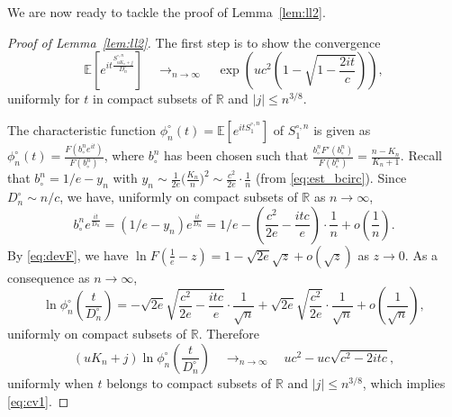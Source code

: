 \documentclass[11pt]{article}
\theoremstyle{definition}
\numberwithin{equation}{section}
\numberwithin{figure}{section}
\numberwithin{table}{section}
\newcommand{\R}{\mathbb{R}}
\def\bcn{b_{\circ}^{n}}
\def\Scn{S^{\circ,n}}
\def\phicn{\phi^{\circ}_{n}}
\def\Dcn{D^{\circ}_{n}}
\newcommand\Es[1]{\mathbb{E}\left[#1\right]}
\begin{document}
We are now ready to tackle the proof of Lemma~\ref{lem:ll2}.
\begin{proof}[Proof of Lemma~\ref{lem:ll2}]
The first step is to show the convergence
\begin{equation}
\label{eq:cv1}\Es{e^{i t \frac{\Scn_{ u K_{n} +j}}{ \Dcn }}}  \quad \mathop{\longrightarrow}_{n \rightarrow \infty} \quad \exp \left( u c^{2} \left( 1 -\sqrt{1-  \frac{2it}{c}}  \right)  \right),
\end{equation}
uniformly for $t$ in compact subsets of $\R$ and $|j| \leq n^{3/8}$.

The characteristic function $\phicn(t)=\Es{e^{it\Scn_{1}}}$  of $\Scn_{1}$
is given as $\phicn(t)= \frac{F( \bcn e^{it})}{F(\bcn)}$,
where $\bcn$ has been chosen such that $ \frac{\bcn F'(\bcn)}{F(\bcn)}= \frac{n-K_{n}}{K_{n}+1}$.
Recall that $\bcn=1/e-y_{n}$ with
\hbox{$y_{n} \sim \frac{1}{2e}  \big( \frac{K_{n}}{n} \big)^{2} \sim \frac{c^{2}}{2e} \cdot \frac{1}{n}$}
(from \eqref{eq:est_bcirc}).
Since $ \Dcn \sim  n /c$, we have, uniformly on compact subsets of $\R$ as $n \rightarrow \infty$,
\[\bcn e^{ \frac{it}{\Dcn}}=(1/e-y_{n})e^{ \frac{it}{\Dcn}}=1/e-  \left( \frac{c^{2}}{2e} - \frac{it c}{e } \right) \cdot \frac{1}{{n}}+o \left(  \frac{1}{n} \right).\]
By \eqref{eq:devF}, we have $ \ln F \left( \frac{1}{e}-z \right)= 1-\sqrt{2e} \sqrt{z}+o(\sqrt{z})$ as $z \rightarrow 0$.
As a consequence as $n \rightarrow \infty$, \[\ln \phicn \left( \frac{t}{ \Dcn } \right)=-\sqrt{2e} \sqrt{ \frac{c^{2}}{2e} - \frac{it c}{e}} \cdot \frac{1}{\sqrt{n}} + \sqrt{2e} \sqrt{ \frac{c^{2}}{2e}} \cdot \frac{1}{\sqrt{n}}+o \left(  \frac{1}{\sqrt{n}} \right),\]
 uniformly on compact subsets of $\R$. Therefore
\[( uK_{n}  +j) \ln \phicn \left( \frac{t}{\Dcn} \right)  \quad \mathop{\longrightarrow}_{n \rightarrow \infty} \quad u c^{2}-uc \sqrt{c^{2}- 2itc},\]
 uniformly when $t$ belongs to compact subsets of $\R$ and $|j| \leq n^{3/8}$, which implies \eqref{eq:cv1}.


\end{proof}
\end{document}
